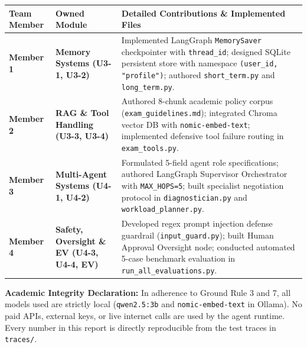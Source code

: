 \documentclass[10pt,a4paper]{article}
\begin{document}
\vspace{1pt}
\small
\begin{tabularx}{\textwidth}{@{} l p{} X @{}}
\toprule
\rowcolor{primary} \textbf{\color{white} Team Member} & \textbf{\color{white} Owned Module} & \textbf{\color{white} Detailed Contributions \& Implemented Files} \\
\midrule
\rowcolor{lightbg} \textbf{Member 1} & \textbf{Memory Systems (U3-1, U3-2)} & Implemented LangGraph \texttt{MemorySaver} checkpointer with \texttt{thread\_id}; designed SQLite persistent store with namespace \texttt{(user\_id, "profile")}; authored \texttt{short\_term.py} and \texttt{long\_term.py}. \\
\textbf{Member 2} & \textbf{RAG \& Tool Handling (U3-3, U3-4)} & Authored 8-chunk academic policy corpus (\texttt{exam\_guidelines.md}); integrated Chroma vector DB with \texttt{nomic-embed-text}; implemented defensive tool failure routing in \texttt{exam\_tools.py}. \\
\rowcolor{lightbg} \textbf{Member 3} & \textbf{Multi-Agent Systems (U4-1, U4-2)} & Formulated 5-field agent role specifications; authored LangGraph Supervisor Orchestrator with \texttt{MAX\_HOPS=5}; built specialist negotiation protocol in \texttt{diagnostician.py} and \texttt{workload\_planner.py}. \\
\textbf{Member 4} & \textbf{Safety, Oversight \& EV (U4-3, U4-4, EV)} & Developed regex prompt injection defense guardrail (\texttt{input\_guard.py}); built Human Approval Oversight node; conducted automated 5-case benchmark evaluation in \texttt{run\_all\_evaluations.py}. \\
\bottomrule
\end{tabularx}

\vspace{2pt}
\begin{tcolorbox}[enhanced, colback=primary!5, colframe=primary!30, arc=2pt, left=5pt, right=5pt, top=3pt, bottom=3pt]
\scriptsize
\textbf{Academic Integrity Declaration:} In adherence to Ground Rule 3 and 7, all models used are strictly local (\texttt{qwen2.5:3b} and \texttt{nomic-embed-text} in Ollama). No paid APIs, external keys, or live internet calls are used by the agent runtime. Every number in this report is directly reproducible from the test traces in \texttt{traces/}.
\end{tcolorbox}
\end{document}
